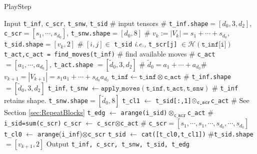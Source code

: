 \documentclass{article}
\newcommand{\py}[1]{\texttt{#1}}
\begin{document}
\begin{algorithm}
\caption{PlayStep}
\label{alg:your_algorithm}
\begin{algorithmic}[1]
\State Input \py{t\_inf}, \py{c\_scr}, \py{t\_snw}, \py{t\_sid}
\hfill \textcolor{green!50!black}{\scriptsize \# input tensors}
\Statex \textcolor{green!50!black}{\scriptsize \# \py{t\_inf.shape}$=[d_0,3,d_2]$, 
\py{c\_scr}$= [s_1,\cdots,s_{d_0}]$,  \py{t\_snw.shape}$=[d_0,8]$}
\Statex \textcolor{green!50!black}{\scriptsize \# $v_k:= \left\vert V_k\right\vert = s_1+\cdots+s_{d_0}$, \py{t\_sid.shape}$=[v_k,2]$}
\Statex \textcolor{green!50!black}{\scriptsize \# $[i,j] \in $ \py{t\_sid} \textit{i.e.,} \py{t\_scr[j]} $\in \mathcal{H}(\py{t\_inf[i]})$} 
\vspace{0.5em}
\State \py{t\_act,c\_act = find\_moves(t\_inf)} \hfill \textcolor{green!50!black}{\scriptsize \# find available moves}
\Statex \textcolor{green!50!black}{\scriptsize \# \py{c\_act} $= [a_1,\cdots,a_{d_0}]$, \py{t\_act.shape} $= [\tilde{d}_0,3,d_2]$}
\Statex \textcolor{green!50!black}{\scriptsize \# $\tilde{d}_0 = a_1+\cdots+a_{d_0}$}\Statex\textcolor{green!50!black}{\scriptsize\#$v_{k+1} = \left\vert V_{k+1}\right\vert =s_1a_1+\cdots+s_{d_0}a_{d_0}$}
\vspace{0.5em}
\State $\py{t\_inf} \gets \py{t\_inf} \otimes \py{c\_act}$ \hfill \textcolor{green!50!black}{\scriptsize \# \py{t\_inf.shape}$=[\tilde{d}_0,3,d_2]$}
\State \py{t\_inf}, \py{t\_snw} $\gets \py{apply\_moves}(\py{t\_inf}, \py{t\_act}, \py{t\_snw})$
\Statex \textcolor{green!50!black}{\scriptsize \# \py{t\_inf} retains shape. \py{t\_snw.shape}$=[\tilde{d}_0,8]$}
\State \py{t\_cl1} $\gets$ \py{t\_sid[:,1]}$\otimes_{\tiny\py{c\_scr}}$\py{c\_act}
\hfill 
\textcolor{green!50!black}{\scriptsize\# See Section \ref{sec:RepeatBlocks}}
\State \py{t\_edg} $\gets$ \py{arange(i\_sid)}$\otimes_{\py{c\_scr}}$\py{c\_act}
\hfill \textcolor{green!50!black}{\scriptsize\# \py{i\_sid=sum(c\_scr)}}
\State \py{c\_scr} $\gets$ \py{c\_scr$\otimes$c\_act}
\hfill \textcolor{green!50!black}{\scriptsize\# \py{c\_scr}$=[s_1,\cdots,s_1,\cdots,s_{d_0},\cdots,s_{d_0}]$}
\State \py{t\_cl0} $\gets$ \py{arange}(\py{i\_inf})$\otimes$\py{c\_scr}
\State \py{t\_sid} $\gets$ \py{cat([t\_cl0,t\_cl1])}  \hfill \textcolor{green!50!black}{\scriptsize \#\py{t\_sid.shape}$=[v_{k+1},2]$}
\State Output \py{t\_inf, c\_scr, t\_snw, t\_sid, t\_edg}
\end{algorithmic}
\end{algorithm}
\end{document}
